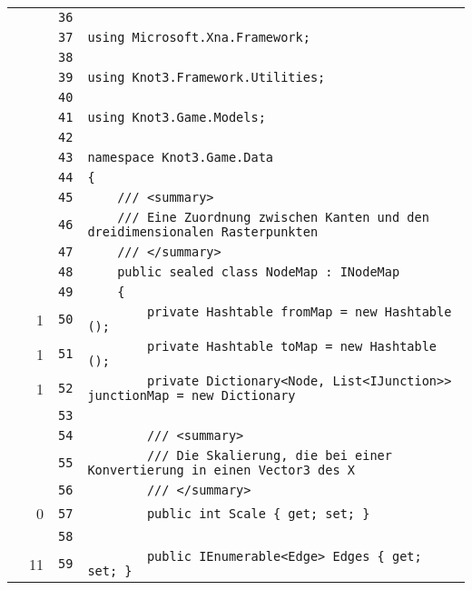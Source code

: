 \documentclass[a4paper,10pt]{article}
\begin{document}
\begin{longtable}[l]{lrrl}
\cellcolor{gray} &  & \verb~36~ & \verb~~\\
\cellcolor{gray} &  & \verb~37~ & \verb~using Microsoft.Xna.Framework;~\\
\cellcolor{gray} &  & \verb~38~ & \verb~~\\
\cellcolor{gray} &  & \verb~39~ & \verb~using Knot3.Framework.Utilities;~\\
\cellcolor{gray} &  & \verb~40~ & \verb~~\\
\cellcolor{gray} &  & \verb~41~ & \verb~using Knot3.Game.Models;~\\
\cellcolor{gray} &  & \verb~42~ & \verb~~\\
\cellcolor{gray} &  & \verb~43~ & \verb~namespace Knot3.Game.Data~\\
\cellcolor{gray} &  & \verb~44~ & \verb~{~\\
\cellcolor{gray} &  & \verb~45~ & \verb~    /// <summary>~\\
\cellcolor{gray} &  & \verb~46~ & \verb~    /// Eine Zuordnung zwischen Kanten und den dreidimensionalen Rasterpunkten~\\
\cellcolor{gray} &  & \verb~47~ & \verb~    /// </summary>~\\
\cellcolor{gray} &  & \verb~48~ & \verb~    public sealed class NodeMap : INodeMap~\\
\cellcolor{gray} &  & \verb~49~ & \verb~    {~\\
\cellcolor{green} & 1 & \verb~50~ & \verb~        private Hashtable fromMap = new Hashtable ();~\\
\cellcolor{green} & 1 & \verb~51~ & \verb~        private Hashtable toMap = new Hashtable ();~\\
\cellcolor{green} & 1 & \verb~52~ & \verb~        private Dictionary<Node, List<IJunction>> junctionMap = new Dictionary~\\
\cellcolor{gray} &  & \verb~53~ & \verb~~\\
\cellcolor{gray} &  & \verb~54~ & \verb~        /// <summary>~\\
\cellcolor{gray} &  & \verb~55~ & \verb~        /// Die Skalierung, die bei einer Konvertierung in einen Vector3 des X~\\
\cellcolor{gray} &  & \verb~56~ & \verb~        /// </summary>~\\
\cellcolor{red} & 0 & \verb~57~ & \verb~        public int Scale { get; set; }~\\
\cellcolor{gray} &  & \verb~58~ & \verb~~\\
\cellcolor{green} & 11 & \verb~59~ & \verb~        public IEnumerable<Edge> Edges { get; set; }~\\

\end{longtable}
\end{document}
